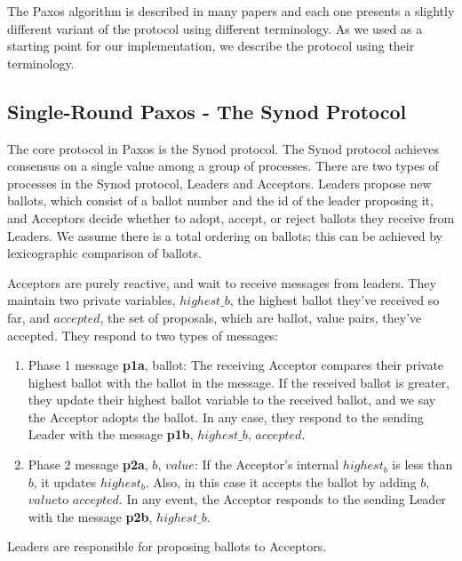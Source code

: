\documentclass{sig-alternate}
\begin{document}
The Paxos algorithm is described in many papers \cite{lamport_part-time_1998, lamport_paxos_2001, lampson_abcds_2001, van_renesse_paxos_2011} and each one presents a slightly different variant of the protocol using different terminology. As we used \cite{van_renesse_paxos_2011} as a starting point for our implementation, we describe the protocol using their terminology.

\subsection{Single-Round Paxos - The Synod Protocol}
The core protocol in Paxos is the Synod protocol. The Synod protocol achieves consensus on a single value among a group of processes. There are two types of processes in the Synod protocol, Leaders and Acceptors. Leaders propose new ballots, which consist of a ballot number and the id of the leader proposing it, and Acceptors decide whether to adopt, accept, or reject ballots they receive from Leaders. We assume there is a total ordering on ballots; this can be achieved by lexicographic comparison of ballots.

Acceptors are purely reactive, and wait to receive messages from leaders. They maintain two private variables, $highest\_b$, the highest ballot they've received so far, and $accepted$, the set of proposals, which are ballot, value pairs, they've accepted. They respond to two types of messages:
\begin{enumerate}
	\item Phase 1 message \textlangle \textbf{p1a}, ballot\textrangle: The receiving Acceptor compares their private highest ballot with the ballot in the message. If the received ballot is greater, they update their highest ballot variable to the received ballot, and we say the Acceptor adopts the ballot. In any case, they respond to the sending Leader with the message \textlangle \textbf{p1b}, $highest\_b$, $accepted$\textrangle.
	
	\item Phase 2 message \textlangle \textbf{p2a}, $b$, $value$\textrangle:
	If the Acceptor's internal $highest_b$ is less than $b$, it updates $highest_b$. Also, in this case it accepts the ballot by adding \textlangle$b$, $value$\textrangle  to $accepted$. In any event, the Acceptor responds to the sending Leader with the message \textlangle \textbf{p2b}, $highest\_b$\textrangle.
\end{enumerate}

Leaders are responsible for proposing ballots to Acceptors. 
\end{document}
